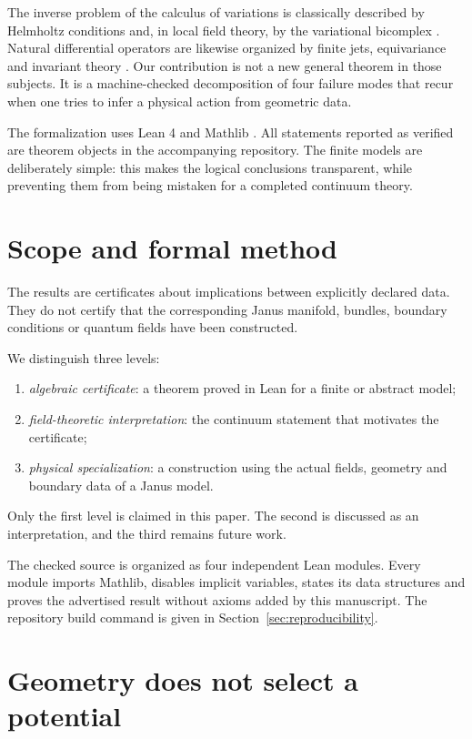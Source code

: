 \documentclass[11pt,a4paper]{article}
\theoremstyle{definition}
\theoremstyle{remark}
\begin{document}
The inverse problem of the calculus of variations is classically described by
Helmholtz conditions and, in local field theory, by the variational bicomplex
\cite{Anderson1992,Olver1993}. Natural differential operators are likewise
organized by finite jets, equivariance and invariant theory
\cite{KolarMichorSlovak1993}. Our contribution is not a new general theorem in
those subjects. It is a machine-checked decomposition of four failure modes
that recur when one tries to infer a physical action from geometric data.

The formalization uses Lean 4 \cite{DeMouraUllrich2021} and Mathlib
\cite{Mathlib2020}. All statements reported as verified are theorem objects in
the accompanying repository. The finite models are deliberately simple: this
makes the logical conclusions transparent, while preventing them from being
mistaken for a completed continuum theory.

\section{Scope and formal method}

The results are certificates about implications between explicitly declared
data. They do not certify that the corresponding Janus manifold, bundles,
boundary conditions or quantum fields have been constructed.

We distinguish three levels:
\begin{enumerate}
  \item \emph{algebraic certificate}: a theorem proved in Lean for a finite or
        abstract model;
  \item \emph{field-theoretic interpretation}: the continuum statement that
        motivates the certificate;
  \item \emph{physical specialization}: a construction using the actual
        fields, geometry and boundary data of a Janus model.
\end{enumerate}
Only the first level is claimed in this paper. The second is discussed as an
interpretation, and the third remains future work.

The checked source is organized as four independent Lean modules. Every module
imports Mathlib, disables implicit variables, states its data structures and
proves the advertised result without axioms added by this manuscript. The
repository build command is given in Section~\ref{sec:reproducibility}.

\section{Geometry does not select a potential}
\label{sec:moduli}
\end{document}
